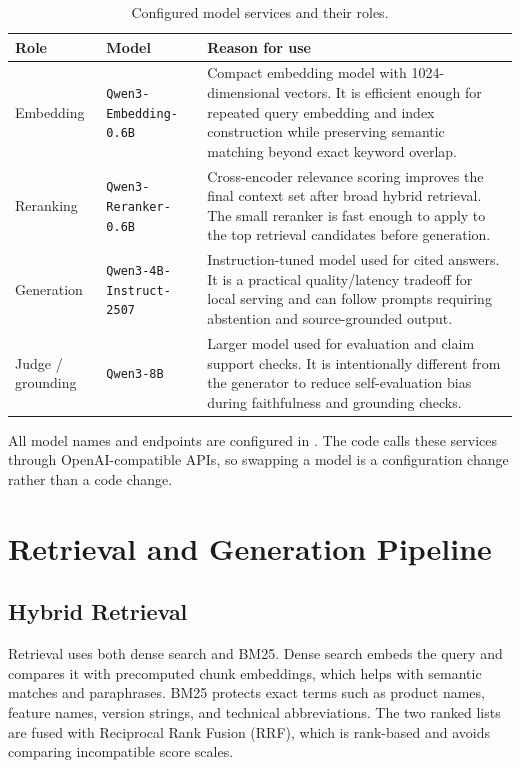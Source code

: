 \documentclass[11pt]{article}
\begin{document}
\begin{table}[h]
\centering
\small
\begin{tabular}{p{}p{}p{}}
\toprule
Role & Model & Reason for use \\
\midrule
Embedding &
\texttt{Qwen3-Embedding-0.6B} &
Compact embedding model with 1024-dimensional vectors. It is efficient enough for repeated
query embedding and index construction while preserving semantic matching beyond exact
keyword overlap. \\
\addlinespace
Reranking &
\texttt{Qwen3-Reranker-0.6B} &
Cross-encoder relevance scoring improves the final context set after broad hybrid
retrieval. The small reranker is fast enough to apply to the top retrieval candidates
before generation. \\
\addlinespace
Generation &
\texttt{Qwen3-4B-Instruct-2507} &
Instruction-tuned model used for cited answers. It is a practical quality/latency tradeoff
for local serving and can follow prompts requiring abstention and source-grounded output. \\
\addlinespace
Judge / grounding &
\texttt{Qwen3-8B} &
Larger model used for evaluation and claim support checks. It is intentionally different
from the generator to reduce self-evaluation bias during faithfulness and grounding checks. \\
\bottomrule
\end{tabular}
\caption{Configured model services and their roles.}
\end{table}

All model names and endpoints are configured in .
The code calls these services through OpenAI-compatible APIs, so swapping a model is a
configuration change rather than a code change.

\section{Retrieval and Generation Pipeline}

\subsection{Hybrid Retrieval}

Retrieval uses both dense search and BM25. Dense search embeds the query and compares it
with precomputed chunk embeddings, which helps with semantic matches and paraphrases.
BM25 protects exact terms such as product names, feature names, version strings, and
technical abbreviations. The two ranked lists are fused with Reciprocal Rank Fusion (RRF),
which is rank-based and avoids comparing incompatible score scales.
\end{document}
